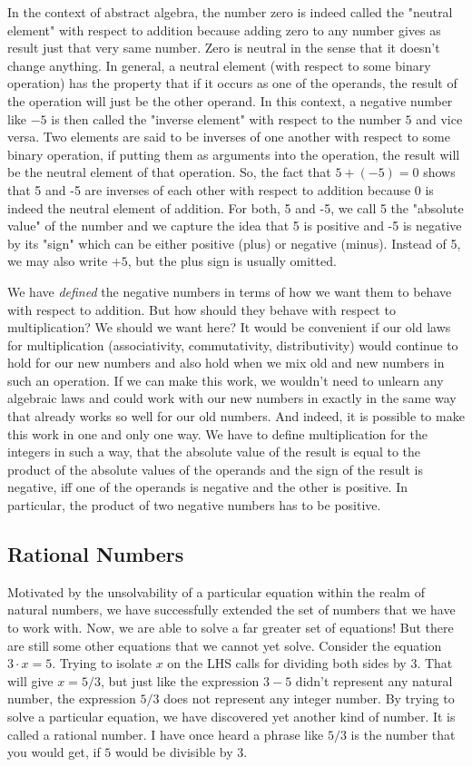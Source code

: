 \medskip
In the context of abstract algebra, the number zero is indeed called the "neutral element" with respect to addition because adding zero to any number gives as result just that very same number. Zero is neutral in the sense that it doesn't change anything. In general, a neutral element (with respect to some binary operation) has the property that if it occurs as one of the operands, the result of the operation will just be the other operand. In this context, a negative number like $-5$ is then called the "inverse element" with respect to the number $5$ and vice versa. Two elements are said to be inverses of one another with respect to some binary operation, if putting them as arguments into the operation, the result will be the neutral element of that operation. So, the fact that $5 + (-5) = 0$ shows that 5 and -5 are inverses of each other with respect to addition because 0 is indeed the neutral element of addition. For both, 5 and -5, we call 5 the "absolute value" of the number and we capture the idea that 5 is positive and -5 is negative by its "sign" which can be either positive (plus) or negative (minus). Instead of 5, we may also write $+5$, but the plus sign is usually omitted.

\medskip
We have \emph{defined} the negative numbers in terms of how we want them to behave with respect to addition. But how should they behave with respect to multiplication? We should we want here? It would be convenient if our old laws for multiplication (associativity, commutativity, distributivity) would continue to hold for our new numbers and also hold when we mix old and new numbers in such an operation. If we can make this work, we wouldn't need to unlearn any algebraic laws and could work with our new numbers in exactly in the same way that already works so well for our old numbers. And indeed, it is possible to make this work in one and only one way. We have to define multiplication for the integers in such a way, that the absolute value of the result is equal to the product of the absolute values of the operands and the sign of the result is negative, iff one of the operands is negative and the other is positive. In particular, the product of two negative numbers has to be positive.


\subsection{Rational Numbers}
Motivated by the unsolvability of a particular equation within the realm of natural numbers, we have successfully extended the set of numbers that we have to work with. Now, we are able to solve a far greater set of equations! But there are still some other equations that we cannot yet solve. Consider the equation $3 \cdot x = 5$. Trying to isolate $x$ on the LHS calls for dividing both sides by 3. That will give $x = 5/3$, but just like the expression $3-5$ didn't represent any natural number, the expression $5/3$ does not represent any integer number. By trying to solve a particular equation, we have discovered yet another kind of number. It is called a rational number. I have once heard a phrase like $5/3$ is the number that you would get, if $5$ would be divisible by $3$.

